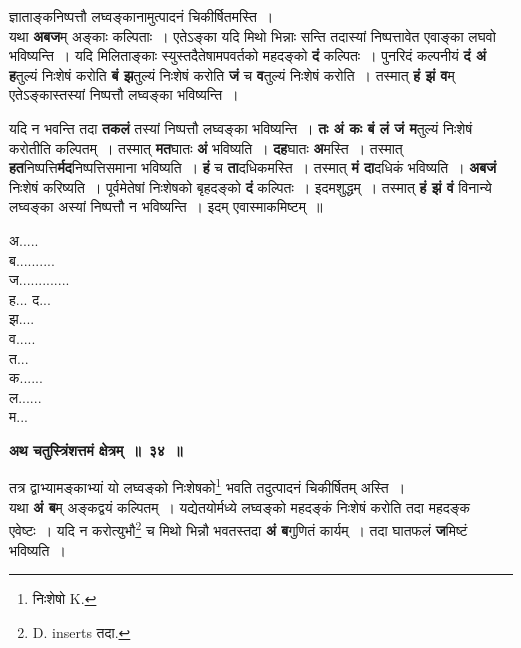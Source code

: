 \documentclass[11pt, openany]{book}
\begin{document}
 {\ab ज्ञाताङ्कनिष्पत्तौ लघ्वङ्कानामुत्पादनं चिकीर्षितमस्ति~। }\\

 यथा \textbf{अबज}म् अङ्काः कल्पिताः~। एतेऽङ्का यदि मिथो भिन्नाः सन्ति तदास्यां निष्पत्तावेत एवाङ्का लघवो भविष्यन्ति~। यदि मिलिताङ्काः स्युस्तदैतेषामपवर्तको महदङ्को \textbf{दं} कल्पितः~। पुनरिदं कल्पनीयं \textbf{दं अं ह}तुल्यं निःशेषं करोति \textbf{बं झ}तुल्यं निःशेषं करोति \textbf{जं} च \textbf{व}तुल्यं निःशेषं करोति~। तस्मात् \textbf{हं झं व}म् एतेऽङ्कास्तस्यां निष्पत्तौ लघ्वङ्का भविष्यन्ति~। 

\newpage
\begin{flushleft}
\begin{minipage}[t]{0.65\textwidth}
यदि न भवन्ति तदा \textbf{तकलं} तस्यां निष्पत्तौ लघ्वङ्का भविष्यन्ति~। \textbf{तः अं कः बं लं जं म}तुल्यं निःशेषं करोतीति कल्पितम्~। तस्मात् \textbf{मत}घातः \textbf{अं} भविष्यति~। \textbf{दह}घातः \textbf{अ}मस्ति~। तस्मात् \textbf{हत}निष्पत्ति\textbf{र्मद}निष्पत्तिसमाना भविष्यति~। \textbf{हं} च \textbf{ता}दधिकमस्ति~। तस्मात् \textbf{मं दा}दधिकं भविष्यति~। \textbf{अबजं} निःशेषं करिष्यति~। पूर्वमेतेषां निःशेषको बृहदङ्को \textbf{दं} कल्पितः~। इदमशुद्धम्~। तस्मात् \textbf{हं झं वं} विनान्ये लघ्वङ्का अस्यां निष्पत्तौ न भविष्यन्ति~। इदम् एवास्माकमिष्टम्~॥
\end{minipage} 
\hfill
\begin{minipage}[t]{0.2\textwidth}
अ.....\\
ब.......... \\
ज............. \\
ह... द...\\
झ.... \\
व..... \\
त... \\
क...... \\
ल......\\
म...
\end{minipage}
\end{flushleft}
\vspace{-3mm}

\begin{center}
\textbf{\large अथ चतुस्त्रिंशत्तमं क्षेत्रम्~॥~३४~॥}
\end{center}

 {\ab तत्र द्वाभ्यामङ्काभ्यां यो लघ्वङ्को निःशेषको\renewcommand{\thefootnote}{१}\footnote{निःशेषो {\en K.}} भवति तदुत्पादनं चिकीर्षितम् अस्ति~। }\\

 यथा \textbf{अं ब}म् अङ्कद्वयं कल्पितम्~। यद्येतयोर्मध्ये लघ्वङ्को महदङ्कं  निःशेषं करोति तदा महदङ्क एवेष्टः~। यदि न करोत्युभौ\renewcommand{\thefootnote}{२}\footnote{{\en D. inserts} तदा.} च मिथो भिन्नौ भवतस्तदा \textbf{अं ब}गुणितं कार्यम्~। तदा घातफलं \textbf{ज}मिष्टं भविष्यति~। 
 
\end{document}
